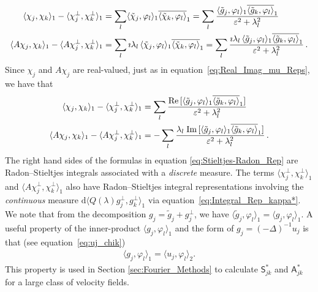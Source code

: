 \documentclass[leqno,onefignum,onetabnum]{siamltex1213}
\renewcommand{\d}{\mathrm{d}}
\newcommand\Real{\mbox{Re}\,} %
\newcommand\Imag{\mbox{Im}\,} %
\newcommand{\Sm}{\mathsf{S}}
\newcommand{\Am}{\mathsf{A}}
\newcommand{\chit}{\tilde{\chi}}
\newcommand{\gt}{\tilde{g}}
\begin{document}
%
\begin{align}%
  \langle\chi_j,\chi_k\rangle_1-\langle\chi_j^\perp,\chi_k^\perp\rangle_1&=\sum_l\langle\chit_j,\varphi_l\rangle_1\overline{\langle\chit_k,\varphi_l\rangle}_1
         =\sum_l\frac{\langle\gt_j,\varphi_l\rangle_1\overline{\langle\gt_k,\varphi_l\rangle}_1}{\varepsilon^2+\lambda_l^2}
         \\%
  \langle A\chi_j,\chi_k\rangle_1-\langle A\chi_j^\perp,\chi_k^\perp\rangle_1&=\sum_l\imath\lambda_l\,\langle\chit_j,\varphi_l\rangle_1\overline{\langle\chit_k,\varphi_l\rangle}_1
         =\sum_l\frac{\imath\lambda_l\,\langle\gt_j,\varphi_l\rangle_1\overline{\langle\gt_k,\varphi_l\rangle}_1}{\varepsilon^2+\lambda_l^2}\,.
         \notag
\end{align}
%
Since $\chi_j$ and $A\chi_j$ are real-valued, just as in
equation~\eqref{eq:Real_Imag_mu_Reps}, we have that
%
\begin{align}\label{eq:Stieltjes-Radon_Rep}
  \langle\chi_j,\chi_k\rangle_1-\langle\chi_j^\perp,\chi_k^\perp\rangle_1&=\sum_l\frac{\Real[\langle\gt_j,\varphi_l\rangle_1\overline{\langle\gt_k,\varphi_l\rangle}_1]}{\varepsilon^2+\lambda_l^2}
         \\
  \langle A\chi_j,\chi_k\rangle_1-\langle A\chi_j^\perp,\chi_k^\perp\rangle_1&=-\sum_l\frac{\lambda_l\;\Imag[\langle\gt_j,\varphi_l\rangle_1\overline{\langle\gt_k,\varphi_l\rangle}_1]}{\varepsilon^2+\lambda_l^2}\,.
         \notag
\end{align}
%
The right hand sides of the formulas in equation
\eqref{eq:Stieltjes-Radon_Rep} are Radon--Stieltjes integrals
associated with a \emph{discrete} measure. The terms $\langle\chi_j^\perp,\chi_k^\perp\rangle_1$ and
$\langle A\chi_j^\perp,\chi_k^\perp\rangle_1$ also have Radon--Stieltjes integral representations
involving the \emph{continuous} measure $\d\langle Q(\lambda)g_j^\perp,g_k^\perp\rangle_1$
via equation~\eqref{eq:Integral_Rep_kappa*}. We note that from the 
decomposition $g_j=\gt_j+g^\perp_j$, we have
$\langle\gt_j,\varphi_l\rangle_1=\langle g_j,\varphi_l\rangle_1$. A useful property of the inner-product
$\langle g_j,\varphi_l\rangle_1$ and the form of $g_j=(-\Delta)^{-1}u_j$ is that (see equation~\eqref{eq:uj_chik})
%
\begin{align}\label{eq:H1_L2}
  \langle g_j,\varphi_l\rangle_1=\langle u_j,\varphi_l\rangle_2.
\end{align}
%
This property is used in Section \ref{sec:Fourier_Methods} to calculate $\Sm^*_{jk}$
and $\Am^*_{jk}$ for a large class of velocity fields.   
\end{document}
